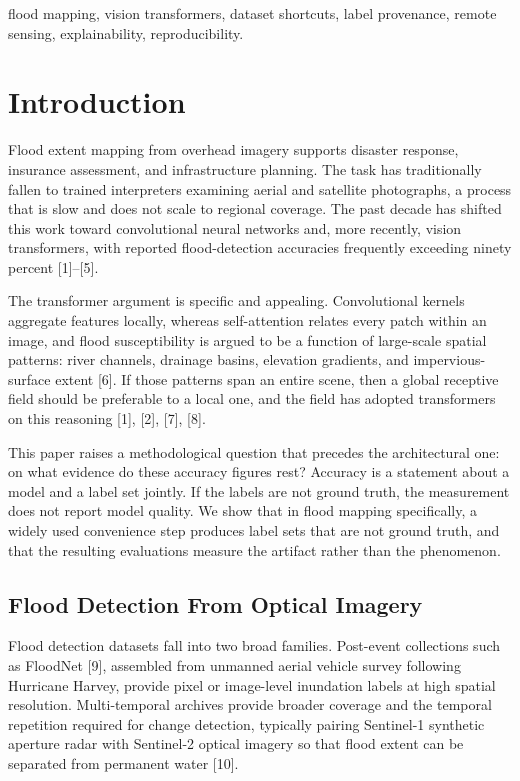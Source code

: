 \documentclass[11pt,journal]{IEEEtran}
\begin{document}
\begin{IEEEkeywords}
flood mapping, vision transformers, dataset shortcuts, label provenance,
remote sensing, explainability, reproducibility.
\end{IEEEkeywords}

\section{Introduction}
\label{sec:intro}

Flood extent mapping from overhead imagery supports disaster response,
insurance assessment, and infrastructure planning. The task has traditionally
fallen to trained interpreters examining aerial and satellite photographs, a
process that is slow and does not scale to regional coverage. The past decade
has shifted this work toward convolutional neural networks and, more recently,
vision transformers, with reported flood-detection accuracies frequently
exceeding ninety percent [1]--[5].

The transformer argument is specific and appealing. Convolutional kernels
aggregate features locally, whereas self-attention relates every patch within an
image, and flood susceptibility is argued to be a function of large-scale
spatial patterns: river channels, drainage basins, elevation gradients, and
impervious-surface extent [6]. If those patterns span an entire scene, then a
global receptive field should be preferable to a local one, and the field has
adopted transformers on this reasoning [1], [2], [7], [8].

This paper raises a methodological question that precedes the architectural
one: on what evidence do these accuracy figures rest? Accuracy is a statement
about a model and a label set jointly. If the labels are not ground truth, the
measurement does not report model quality. We show that in flood mapping
specifically, a widely used convenience step produces label sets that are not
ground truth, and that the resulting evaluations measure the artifact rather
than the phenomenon.

\subsection{Flood Detection From Optical Imagery}

Flood detection datasets fall into two broad families. Post-event collections
such as FloodNet [9], assembled from unmanned aerial vehicle survey following
Hurricane Harvey, provide pixel or image-level inundation labels at high spatial
resolution. Multi-temporal archives provide broader coverage and the temporal
repetition required for change detection, typically pairing Sentinel-1
synthetic aperture radar with Sentinel-2 optical imagery so that flood extent
can be separated from permanent water [10].
\end{document}
